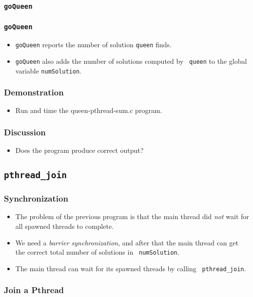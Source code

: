 \documentclass{beamer}
\begin{document}
\begin{frame}
\frametitle{\tt goQueen}
\end{frame}

\begin{frame}
\frametitle{\tt goQueen}
\begin{itemize}
\item {\tt goQueen} reports the number of solution {\tt queen} finds.
\item {\tt goQueen} also adds the number of solutions computed by {\tt
  queen} to the global variable {\tt numSolution}.
\end{itemize}
\end{frame}

\begin{frame}
\frametitle{Demonstration}
\begin{itemize}
\item Run and time the queen-pthread-sum.c program.
\end{itemize}
\end{frame}

\begin{frame}
\frametitle{Discussion}
\begin{itemize}
\item Does the program produce correct output?
\end{itemize}
\end{frame}

\subsection{\tt pthread\_join}

\begin{frame}
\frametitle{Synchronization}
\begin{itemize}
\item The problem of the previous program is that the main thread did
  {\em not} wait for all spawned threads to complete.
\item We need a {\em barrier synchronization}, and after that the main
  thread can get the correct total number of solutions in {\tt
    numSolution}.
\item The main thread can wait for its spawned threads by calling {\tt
  pthread\_join}.
\end{itemize}
\end{frame}

\begin{frame}
\frametitle{Join a Pthread}
\centerline{}
\end{frame}
\end{document}
